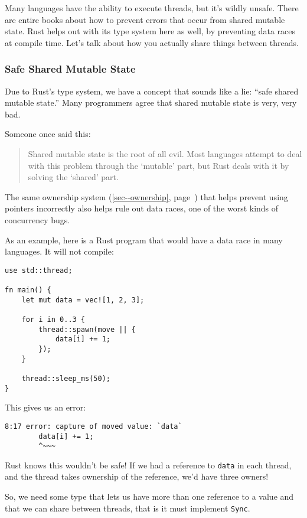 \documentclass[a4paper,]{book}
\renewcommand*{\hyperref}[2][\ar]{%
  \def\ar{#2}%
  #2 (\autoref{#1}, page~\pageref{#1})}
\begin{document}
Many languages have the ability to execute threads, but it's wildly
unsafe. There are entire books about how to prevent errors that occur
from shared mutable state. Rust helps out with its type system here as
well, by preventing data races at compile time. Let's talk about how you
actually share things between threads.

\subsubsection{Safe Shared Mutable
State}\label{safe-shared-mutable-state}

Due to Rust's type system, we have a concept that sounds like a lie:
``safe shared mutable state.'' Many programmers agree that shared
mutable state is very, very bad.

Someone once said this:

\begin{quote}
Shared mutable state is the root of all evil. Most languages attempt to
deal with this problem through the `mutable' part, but Rust deals with
it by solving the `shared' part.
\end{quote}

The same \hyperref[sec--ownership]{ownership system} that helps prevent
using pointers incorrectly also helps rule out data races, one of the
worst kinds of concurrency bugs.

As an example, here is a Rust program that would have a data race in
many languages. It will not compile:

\begin{verbatim}
use std::thread;

fn main() {
    let mut data = vec![1, 2, 3];

    for i in 0..3 {
        thread::spawn(move || {
            data[i] += 1;
        });
    }

    thread::sleep_ms(50);
}
\end{verbatim}

This gives us an error:

\begin{verbatim}
8:17 error: capture of moved value: `data`
        data[i] += 1;
        ^~~~
\end{verbatim}

Rust knows this wouldn't be safe! If we had a reference to \texttt{data}
in each thread, and the thread takes ownership of the reference, we'd
have three owners!

So, we need some type that lets us have more than one reference to a
value and that we can share between threads, that is it must implement
\texttt{Sync}.
\end{document}
